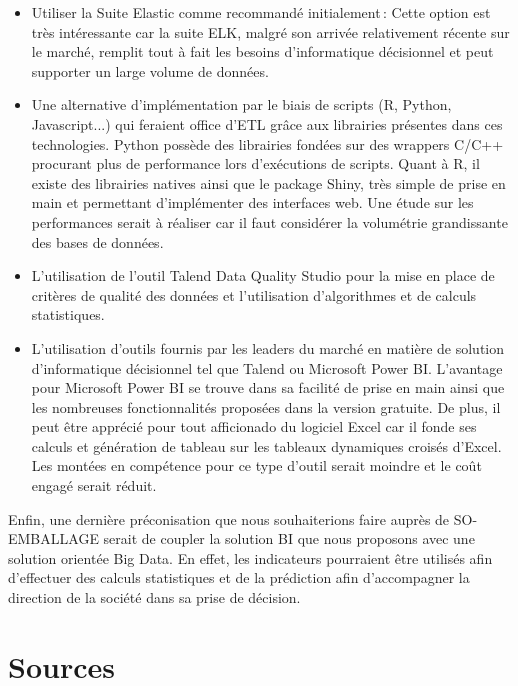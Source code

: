 \begin{itemize}[label=\textbullet, font=\LARGE \color{listGreen}]	
	\item Utiliser la Suite Elastic comme recommandé initialement : Cette option est très intéressante car la suite ELK, malgré son arrivée relativement récente sur le marché, remplit tout à fait les besoins d’informatique décisionnel et peut supporter un large volume de données.  
	\item Une alternative d’implémentation par le biais de scripts (R, Python, Javascript...) qui feraient office d’ETL grâce aux librairies présentes dans ces technologies. Python possède des librairies fondées sur des wrappers C/C++ procurant plus de performance lors d’exécutions de scripts. Quant à R, il existe des librairies natives ainsi que le package Shiny, très simple de prise en main et permettant d’implémenter des interfaces web. Une étude sur les performances serait à réaliser car il faut considérer la volumétrie grandissante des bases de données. 
	\item L’utilisation de l’outil Talend Data Quality Studio pour la mise en place de critères de qualité des données et l’utilisation d’algorithmes et de calculs statistiques. 
	\item L’utilisation d’outils fournis par les leaders du marché en matière de solution d’informatique décisionnel tel que Talend ou Microsoft Power BI. L’avantage pour Microsoft Power BI se trouve dans sa facilité de prise en main ainsi que les nombreuses fonctionnalités proposées dans la version gratuite. De plus, il peut être apprécié pour tout afficionado du logiciel Excel car il fonde ses calculs et génération de tableau sur les tableaux dynamiques croisés d’Excel. Les montées en compétence pour ce type d’outil serait moindre et le coût engagé serait réduit. 
\end{itemize} 

Enfin, une dernière préconisation que nous souhaiterions faire auprès de SO-EMBALLAGE serait de coupler la solution BI que nous proposons avec une solution orientée Big Data. En effet, les indicateurs pourraient être utilisés afin d’effectuer des calculs statistiques et de la prédiction afin d’accompagner la direction de la société dans sa prise de décision.  

\newpage

\section{Sources}


